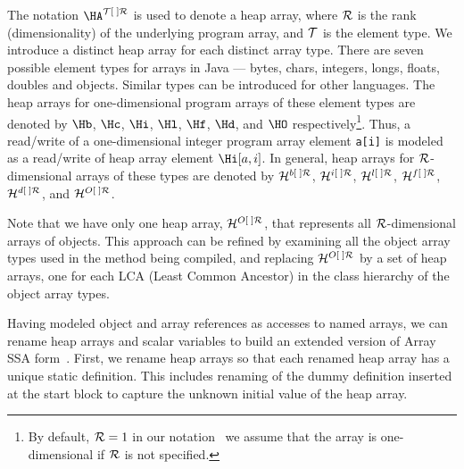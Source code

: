 The notation $\HA^{{\cal{T}}[\;]{\cal{R}}}$ is used
to denote a heap
array, where $\cal{R}$ is the rank (dimensionality) of the underlying
program
array, and
$\cal{T}$ is the element type.  
We
introduce a distinct heap array for each distinct array type.  
There are seven possible element
types for arrays in Java
--- bytes, chars, integers, longs, floats, doubles and objects.
Similar types can be introduced for other languages.
The
heap arrays for one-dimensional program
arrays of these element types are
denoted by $\Hb$, $\Hc$, $\Hi$, $\Hl$, $\Hf$, $\Hd$, and $\HO$
respectively\footnote{By default, ${\cal{R}} = 1$ in our
notation \ie\ we assume that the array is one-dimensional if
$\cal{R}$ is not specified.}.  
Thus, a read/write of a one-dimensional integer program
array element {\tt a[i]}
is modeled as a read/write of heap array element $\Hi[a,i]$.
In general, heap arrays for $\cal{R}$-dimensional arrays of these
types are denoted by ${\cal{H}}^{b[\;]{\cal{R}}}$,
${\cal{H}}^{i[\;]{\cal{R}}}$,
${\cal{H}}^{l[\;]{\cal{R}}}$,
${\cal{H}}^{f[\;]{\cal{R}}}$,
${\cal{H}}^{d[\;]{\cal{R}}}$, and
${\cal{H}}^{O[\;]{\cal{R}}}$.

Note that we have only one heap array, ${\cal{H}}^{O[\;]{\cal{R}}}$, that
represents all $\cal{R}$-dimensional arrays of objects. 
This approach can be refined by examining
all the object array types used in the method being compiled,
and replacing ${\cal{H}}^{O[\;]{\cal{R}}}$
by a set of heap arrays, one for each LCA (Least
Common Ancestor) in the class hierarchy of the object array types.

Having modeled object and array references as accesses to
named arrays, we can rename heap arrays and scalar variables
to build an extended version of Array SSA form~\cite{KnSa98}.
First, we rename heap arrays so
that each renamed heap array
has a unique static definition.
This includes renaming of the dummy definition 
inserted at the start block to capture the unknown initial value
of the heap array.

